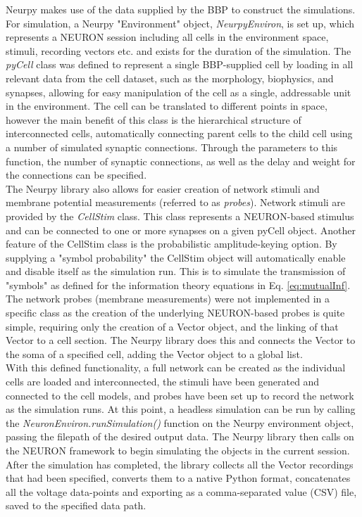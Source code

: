 \documentclass[letterpaper, 10 pt, conference]{ieeeconf}  %
\begin{document}
Neurpy makes use of the data supplied by the BBP to construct the simulations. For simulation, a Neurpy "Environment" object, \emph{NeurpyEnviron}, is set up, which represents a NEURON session including all cells in the environment space, stimuli, recording vectors etc. and exists for the duration of the simulation. The \emph{pyCell} class was defined to represent a single BBP-supplied cell by loading in all relevant data from the cell dataset, such as the morphology, biophysics, and synapses, allowing for easy manipulation of the cell as a single, addressable unit in the environment. The cell can be translated to different points in space, however the main benefit of this class is the hierarchical structure of interconnected cells, automatically connecting parent cells to the child cell using a number of simulated synaptic connections. Through the parameters to this function, the number of synaptic connections, as well as the delay and weight for the connections can be specified.\\

The Neurpy library also allows for easier creation of network stimuli and membrane potential measurements (referred to as \emph{probes}). Network stimuli are provided by the \emph{CellStim} class. This class represents a NEURON-based stimulus and can be connected to one or more synapses on a given pyCell object. Another feature of the CellStim class is the probabilistic amplitude-keying option. By supplying a "symbol probability" the CellStim object will automatically enable and disable itself as the simulation run. This is to simulate the transmission of "symbols" as defined for the information theory equations in Eq. \ref{eq:mutualInf}. The network probes (membrane measurements) were not implemented in a specific class as the creation of the underlying NEURON-based probes is quite simple, requiring only the creation of a Vector object, and the linking of that Vector to a cell section. The Neurpy library does this and connects the Vector to the soma of a specified cell, adding the Vector object to a global list.\\

With this defined functionality, a full network can be created as the individual cells are loaded and interconnected, the stimuli have been generated and connected to the cell models, and probes have been set up to record the network as the simulation runs. At this point, a headless simulation can be run by calling the \emph{NeuronEnviron.runSimulation()} function on the Neurpy environment object, passing the filepath of the desired output data. The Neurpy library then calls on the NEURON framework to begin simulating the objects in the current session. After the simulation has completed, the library collects all the Vector recordings that had been specified, converts them to a native Python format, concatenates all the voltage data-points and exporting as a comma-separated value (CSV) file, saved to the specified data path.\\ 
\end{document}

